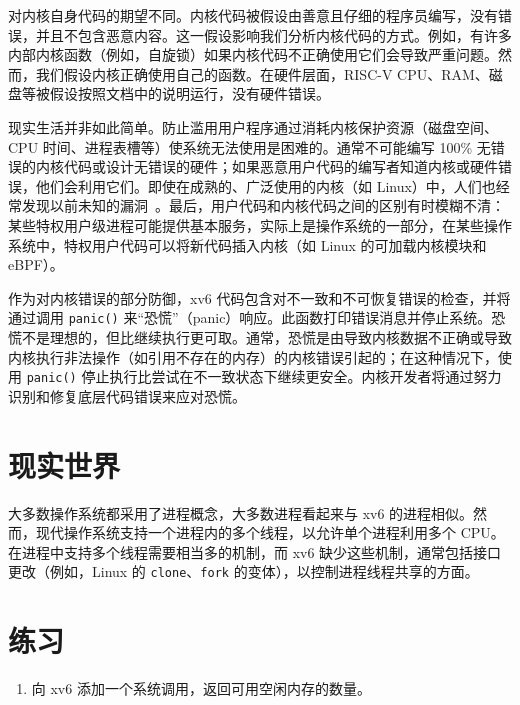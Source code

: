 对内核自身代码的期望不同。内核代码被假设由善意且仔细的程序员编写，没有错误，并且不包含恶意内容。这一假设影响我们分析内核代码的方式。例如，有许多内部内核函数（例如，自旋锁）如果内核代码不正确使用它们会导致严重问题。然而，我们假设内核正确使用自己的函数。在硬件层面，RISC-V CPU、RAM、磁盘等被假设按照文档中的说明运行，没有硬件错误。

现实生活并非如此简单。防止滥用用户程序通过消耗内核保护资源（磁盘空间、CPU 时间、进程表槽等）使系统无法使用是困难的。通常不可能编写 100\% 无错误的内核代码或设计无错误的硬件；如果恶意用户代码的编写者知道内核或硬件错误，他们会利用它们。即使在成熟的、广泛使用的内核（如 Linux）中，人们也经常发现以前未知的漏洞~\cite{mitre:cves}。最后，用户代码和内核代码之间的区别有时模糊不清：某些特权用户级进程可能提供基本服务，实际上是操作系统的一部分，在某些操作系统中，特权用户代码可以将新代码插入内核（如 Linux 的可加载内核模块和 eBPF）。

作为对内核错误的部分防御，xv6 代码包含对不一致和不可恢复错误的检查，并将通过调用 {\tt panic()} 来``恐慌''（panic）响应。此函数打印错误消息并停止系统。恐慌不是理想的，但比继续执行更可取。通常，恐慌是由导致内核数据不正确或导致内核执行非法操作（如引用不存在的内存）的内核错误引起的；在这种情况下，使用 {\tt panic()} 停止执行比尝试在不一致状态下继续更安全。内核开发者将通过努力识别和修复底层代码错误来应对恐慌。

\section{现实世界}

大多数操作系统都采用了进程概念，大多数进程看起来与 xv6 的进程相似。然而，现代操作系统支持一个进程内的多个线程，以允许单个进程利用多个 CPU。在进程中支持多个线程需要相当多的机制，而 xv6 缺少这些机制，通常包括接口更改（例如，Linux 的 \lstinline{clone}、\lstinline{fork} 的变体），以控制进程线程共享的方面。
\section{练习}

\begin{enumerate}

\item 向 xv6 添加一个系统调用，返回可用空闲内存的数量。


\end{enumerate}
